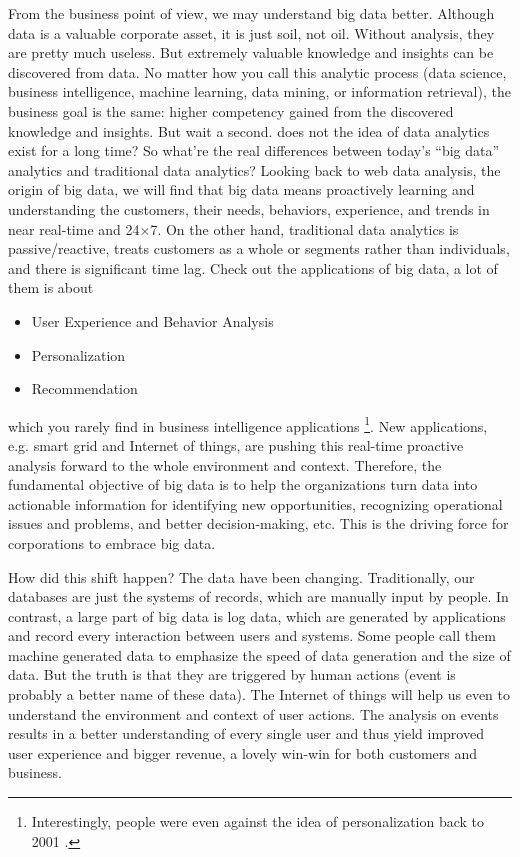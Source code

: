 \documentclass[12pt]{book}
\begin{document}
From the business point of view, we may understand big data better. Although data is a valuable corporate asset, it is just soil, not oil. Without analysis, they are pretty much useless. But extremely valuable knowledge and insights can be discovered from data. No matter how you call this analytic process (data science, business intelligence, machine learning, data mining, or information retrieval), the business goal is the same: higher competency gained from the discovered knowledge and insights. But wait a second. does not the idea of data analytics exist for a long time? So what're the real differences between today's ``big data'' analytics and traditional data analytics? Looking back to web data analysis, the origin of big data, we will find that big data means proactively learning and understanding the customers, their needs, behaviors, experience, and trends in near real-time and 24$\times$7. On the other hand, traditional data analytics is passive/reactive, treats customers as a whole or segments rather than individuals, and there is significant time lag. Check out the applications of big data, a lot of them is about
\begin{itemize}
\item User Experience and Behavior Analysis
\item Personalization
\item Recommendation
\end{itemize}
which you rarely find in business intelligence applications \footnote{Interestingly, people were even against the idea of personalization back to 2001 \cite{NunesKambil2001}.}. New applications, e.g. smart grid and Internet of things, are pushing this real-time proactive analysis forward to the whole environment and context. Therefore, the fundamental objective of big data is to help the organizations turn data into actionable information for identifying new opportunities, recognizing operational issues and problems, and better decision-making, etc. This is the driving force for corporations to embrace big data.

How did this shift happen? The data have been changing. Traditionally, our databases are just the systems of records, which are manually input by people. In contrast, a large part of big data is log data, which are generated by applications and record every interaction between users and systems. Some people call them machine generated data to emphasize the speed of data generation and the size of data. But the truth is that they are triggered by human actions (event is probably a better name of these data). The Internet of things will help us even to understand the environment and context of user actions. The analysis on events results in a better understanding of every single user and thus yield improved user experience and bigger revenue, a lovely win-win for both customers and business.
\end{document}

